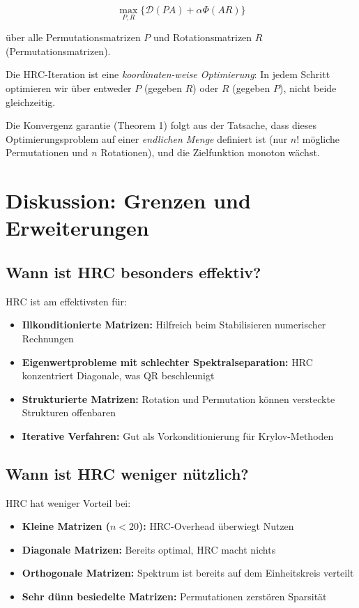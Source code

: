 \documentclass[a4paper,12pt]{article}
\theoremstyle{definition}
\begin{document}
\[
\max_{P, R} \{ \mathcal{D}(PA) + \alpha \Phi(AR) \}
\]

über alle Permutationsmatrizen $P$ und Rotationsmatrizen $R$ (Permutationsmatrizen).

Die HRC-Iteration ist eine \emph{koordinaten-weise Optimierung}: In jedem Schritt optimieren wir über entweder $P$ (gegeben $R$) oder $R$ (gegeben $P$), nicht beide gleichzeitig.

Die Konvergenz garantie (Theorem 1) folgt aus der Tatsache, dass dieses Optimierungsproblem auf einer \emph{endlichen Menge} definiert ist (nur $n!$ mögliche Permutationen und $n$ Rotationen), und die Zielfunktion monoton wächst.

\section{Diskussion: Grenzen und Erweiterungen}

\subsection{Wann ist HRC besonders effektiv?}

HRC ist am effektivsten für:

\begin{itemize}
	\item \textbf{Illkonditionierte Matrizen:} Hilfreich beim Stabilisieren numerischer Rechnungen
	\item \textbf{Eigenwertprobleme mit schlechter Spektralseparation:} HRC konzentriert Diagonale, was QR beschleunigt
	\item \textbf{Strukturierte Matrizen:} Rotation und Permutation können versteckte Strukturen offenbaren
	\item \textbf{Iterative Verfahren:} Gut als Vorkonditionierung für Krylov-Methoden
\end{itemize}

\subsection{Wann ist HRC weniger nützlich?}

HRC hat weniger Vorteil bei:

\begin{itemize}
	\item \textbf{Kleine Matrizen ($n < 20$):} HRC-Overhead überwiegt Nutzen
	\item \textbf{Diagonale Matrizen:} Bereits optimal, HRC macht nichts
	\item \textbf{Orthogonale Matrizen:} Spektrum ist bereits auf dem Einheitskreis verteilt
	\item \textbf{Sehr dünn besiedelte Matrizen:} Permutationen zerstören Sparsität
\end{itemize}
\end{document}
